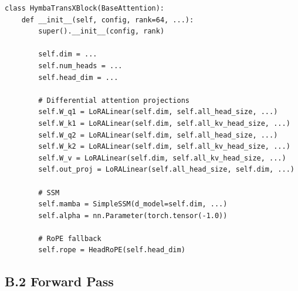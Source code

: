 \begin{lstlisting}
class HymbaTransXBlock(BaseAttention):
    def __init__(self, config, rank=64, ...):
        super().__init__(config, rank)
        
        self.dim = ...
        self.num_heads = ...
        self.head_dim = ...
        
        # Differential attention projections
        self.W_q1 = LoRALinear(self.dim, self.all_head_size, ...)
        self.W_k1 = LoRALinear(self.dim, self.all_kv_head_size, ...)
        self.W_q2 = LoRALinear(self.dim, self.all_head_size, ...)
        self.W_k2 = LoRALinear(self.dim, self.all_kv_head_size, ...)
        self.W_v = LoRALinear(self.dim, self.all_kv_head_size, ...)
        self.out_proj = LoRALinear(self.all_head_size, self.dim, ...)
        
        # SSM
        self.mamba = SimpleSSM(d_model=self.dim, ...)
        self.alpha = nn.Parameter(torch.tensor(-1.0))
        
        # RoPE fallback
        self.rope = HeadRoPE(self.head_dim)
\end{lstlisting}

\subsection{B.2 Forward Pass}

